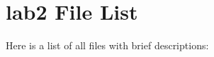 \section{lab2 File List}
Here is a list of all files with brief descriptions:\begin{CompactList}
\item{}
\item{}
\item{}
\end{CompactList}
